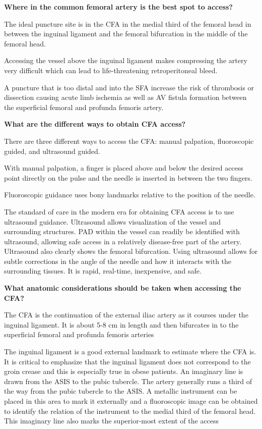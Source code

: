 \documentclass[
]{book}
\begin{document}
\textbf{Where in the common femoral artery is the best spot to access?}

The ideal puncture site is in the CFA in the medial third of the femoral
head in between the inguinal ligament and the femoral bifurcation in the
middle of the femoral head.

Accessing the vessel above the inguinal ligament makes compressing the
artery very difficult which can lead to life-threatening retroperitoneal
bleed.

A puncture that is too distal and into the SFA increase the risk of
thrombosis or dissection causing acute limb ischemia as well as AV
fistula formation between the superficial femoral and profunda femoris
artery.

\textbf{What are the different ways to obtain CFA access?}

There are three different ways to access the CFA: manual palpation,
fluoroscopic guided, and ultrasound guided.

With manual palpation, a finger is placed above and below the desired
access point directly on the pulse and the needle is inserted in between
the two fingers.

Fluoroscopic guidance uses bony landmarks relative to the position of
the needle.

The standard of care in the modern era for obtaining CFA access is to
use ultrasound guidance. Ultrasound allows visualization of the vessel
and surrounding structures. PAD within the vessel can readily be
identified with ultrasound, allowing safe access in a relatively
disease-free part of the artery. Ultrasound also clearly shows the
femoral bifurcation. Using ultrasound allows for subtle corrections in
the angle of the needle and how it interacts with the surrounding
tissues. It is rapid, real-time, inexpensive, and safe.

\textbf{What anatomic considerations should be taken when accessing the CFA?}

The CFA is the continuation of the external iliac artery as it courses
under the inguinal ligament. It is about 5-8 cm in length and then
bifurcates in to the superficial femoral and profunda femoris arteries

The inguinal ligament is a good external landmark to estimate where the
CFA is. It is critical to emphasize that the inguinal ligament does not
correspond to the groin crease and this is especially true in obese
patients. An imaginary line is drawn from the ASIS to the pubic
tubercle. The artery generally runs a third of the way from the pubic
tubercle to the ASIS. A metallic instrument can be placed in this area
to mark it externally and a fluoroscopic image can be obtained to
identify the relation of the instrument to the medial third of the
femoral head. This imaginary line also marks the superior-most extent of
the access
\end{document}
